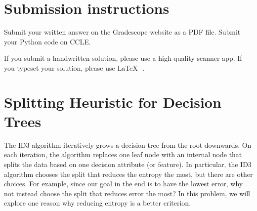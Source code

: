 \documentclass[11pt]{article}
\begin{document}
\author{}
\date{}
\vspace{-1in}
\maketitle
\vspace{-0.75in}




\section*{Submission instructions}
\begin{itemize}
{\large
\item 
Submit your written answer on the Gradescope website as a PDF file. Submit your Python code on CCLE. 
\item If you submit a handwritten solution, please use a high-quality scanner app. If you typeset your solution, please use \LaTeX $\text{ }$.
}
\end{itemize}


\section{Splitting Heuristic for Decision Trees }

The ID3 algorithm iteratively grows a decision tree from the root downwards. On each iteration, the algorithm replaces one leaf node with an internal node that splits the data based on one decision attribute (or feature). In particular, the ID3 algorithm chooses the split that reduces the entropy the most, but there are other choices. For example, since our goal in the end is to have the lowest error, why not instead choose the split that reduces error the most? In this problem, we will explore one reason why reducing entropy is a better criterion.
\end{document}
